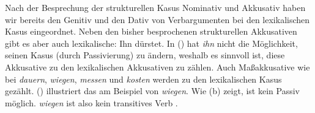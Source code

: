 Nach der Besprechung der strukturellen Kasus Nominativ und Akkusativ haben wir bereits den Genitiv und den
Dativ von Verbargumenten bei den lexikalischen Kasus eingeordnet. Neben den bisher besprochenen
strukturellen Akkusativen gibt es aber auch lexikalische:
\ea Ihn dürstet.
\z
In () hat \emph{ihn} nicht die Möglichkeit, seinen Kasus (\zb durch Passivierung) zu ändern,
weshalb es sinnvoll ist, diese Akkusative zu den lexikalischen Akkusativen zu zählen. Auch
Maßakkusative wie bei \emph{dauern}, \emph{wiegen}, \emph{messen} und \emph{kosten} werden zu den
lexikalischen Kasus gezählt. () illustriert das am Beispiel von \emph{wiegen}.
\eal
{}
\zl
Wie (b) zeigt, ist kein Passiv möglich. \emph{wiegen} ist also kein transitives Verb
\citep[§531]{Duden2005-Authors}.

